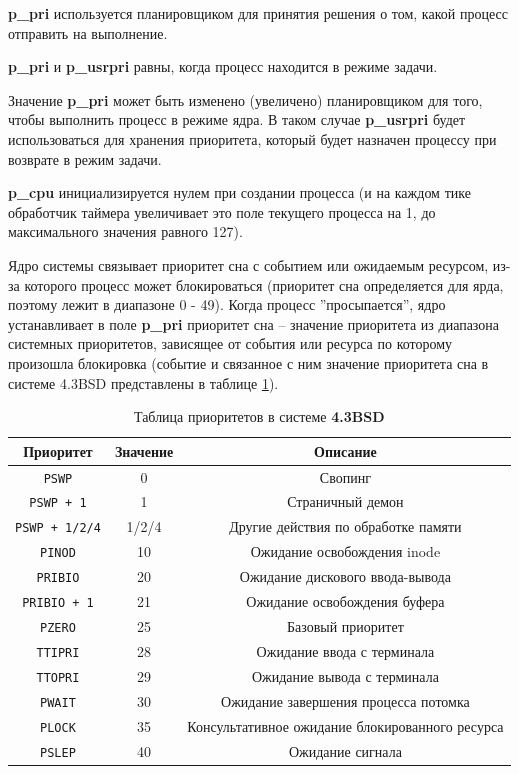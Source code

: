 \documentclass[a4paper,14pt,russian]{extreport}
\begin{document}
	\textbf{p\_pri} используется планировщиком для принятия решения о том, какой процесс отправить на выполнение.
	
	\textbf{p\_pri} и \textbf{p\_usrpri} равны, когда процесс находится в режиме задачи.
	
	Значение \textbf{p\_pri} может быть изменено (увеличено) планировщиком для того, чтобы выполнить процесс в режиме ядра.
	В таком случае \textbf{p\_usrpri} будет использоваться для хранения приоритета, который будет назначен	процессу при возврате в режим задачи.
	
	\textbf{p\_cpu} инициализируется нулем при создании процесса (и на каждом тике обработчик таймера увеличивает это поле текущего процесса на 1, до максимального значения равного 127).
	
	Ядро системы связывает приоритет сна с событием или ожидаемым ресурсом, из-за которого процесс может блокироваться (приоритет сна определяется для ярда, поэтому лежит в диапазоне 0 - 49).
	Когда процесс ”просыпается”, ядро устанавливает в поле \textbf{p\_pri} приоритет сна – значение приоритета из диапазона системных приоритетов, зависящее от события или ресурса по которому произошла блокировка (событие и связанное с ним значение приоритета сна в системе 4.3BSD представлены в таблице \ref{tab:bsd}).
	
	\begin{table}[h]
		\caption{Таблица приоритетов в системе \textbf{4.3BSD}}
		\label{tab:bsd}
		\begin{center}
			\begin{tabular}{ |c|c|c|  }
				\hline
				\textbf{Приоритет} & \textbf{Значение} & \textbf{Описание} \\
				\hline
				\texttt{PSWP} & 0 & Свопинг \\
				\hline
				\texttt{PSWP + 1} & 1 & Страничный демон \\
				\hline
				\texttt{PSWP + 1/2/4} & 1/2/4 & Другие действия по обработке памяти \\
				\hline
				\texttt{PINOD} & 10 & Ожидание освобождения inode \\
				\hline
				\texttt{PRIBIO} & 20 & Ожидание дискового ввода-вывода \\
				\hline
				\texttt{PRIBIO + 1} & 21 & Ожидание освобождения буфера \\
				\hline
				\texttt{PZERO} & 25 & Базовый приоритет \\
				\hline
				\texttt{TTIPRI} & 28 & Ожидание ввода с терминала \\
				\hline
				\texttt{TTOPRI} & 29 & Ожидание вывода с терминала \\
				\hline 
				\texttt{PWAIT} & 30 & Ожидание завершения процесса потомка \\
				\hline
				\texttt{PLOCK} & 35 & Консультативное ожидание блокированного ресурса \\
				\hline
				\texttt{PSLEP} & 40 & Ожидание сигнала \\
				\hline
			\end{tabular}
		\end{center}
	\end{table}
	
\end{document}
